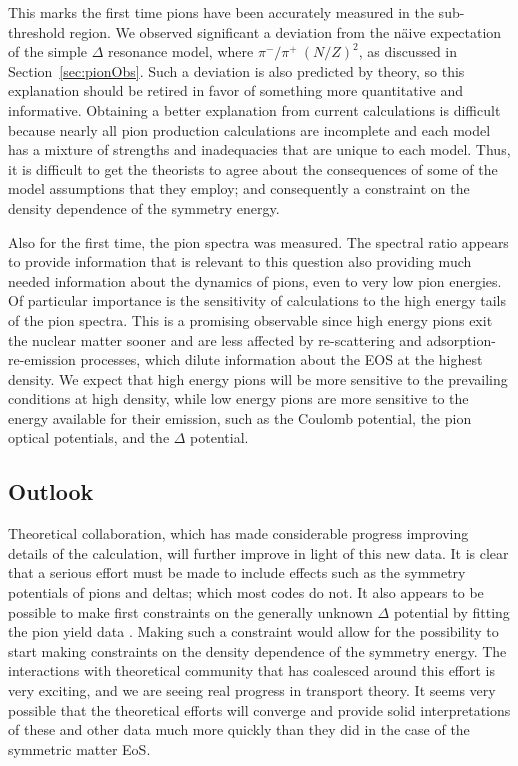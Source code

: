   This marks the first time pions have been accurately measured in the sub-threshold region. We observed significant a deviation from the  n\"aive expectation of the simple $\Delta$ resonance model, where $\pi^-/\pi^+ ~ (N/Z)^2$, as discussed in Section~\ref{sec:pionObs}. Such a deviation is also predicted by theory, so this explanation should be retired in favor of something more quantitative and informative. Obtaining a better explanation from current calculations is difficult because nearly all pion production calculations are incomplete and each model has a mixture of strengths and inadequacies that are unique to each model. Thus, it is difficult to get the theorists to agree about the consequences of some of the model assumptions that they employ; and consequently a constraint on the density dependence of the symmetry energy. 
  
  Also for the first time, the pion spectra was measured. The spectral ratio appears to provide information that is relevant to this question also providing much needed information about the dynamics of pions, even to very low pion energies. Of particular importance is the sensitivity of calculations to the high energy tails of the pion spectra. This is a promising observable since high energy pions  exit the nuclear matter sooner and are less affected by re-scattering and adsorption-re-emission processes, which dilute information about the EOS at the highest density. We expect that high energy pions will be more sensitive to the prevailing conditions at high density, while low energy pions are more sensitive to the energy available for their emission, such as the Coulomb potential, the pion optical potentials, and the $\Delta$ potential. 


\subsection{Outlook}
Theoretical collaboration, which has made considerable progress improving details of the calculation, will further improve in light of this new data. It is clear that a serious effort must be made to include effects such as the symmetry potentials of pions and deltas; which most codes do not. It also appears to be possible to make first constraints on the generally unknown $\Delta$ potential by fitting the pion yield data \cite{cozmaPC}. Making such a constraint would allow for the possibility to start making constraints on the density dependence of the symmetry energy. The interactions with theoretical community that has coalesced around this effort is very exciting, and we are seeing real progress in transport theory. It seems very possible that the theoretical efforts will converge and provide solid interpretations of these and other data much more quickly than they did in the case of the symmetric matter EoS. 

